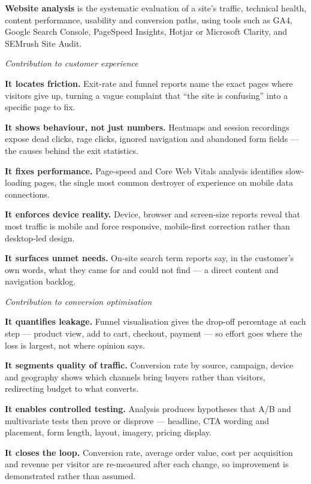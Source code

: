 \begin{qlist}
\textbf{Website analysis} is the systematic evaluation of a site's traffic,
technical health, content performance, usability and conversion paths, using
tools such as GA4, Google Search Console, PageSpeed Insights, Hotjar or
Microsoft Clarity, and SEMrush Site Audit.

\textit{Contribution to customer experience}
\begin{apts}
\item \textbf{It locates friction.} Exit-rate and funnel reports name the exact
      pages where visitors give up, turning a vague complaint that ``the site
      is confusing'' into a specific page to fix.
\item \textbf{It shows behaviour, not just numbers.} Heatmaps and session
      recordings expose dead clicks, rage clicks, ignored navigation and
      abandoned form fields --- the causes behind the exit statistics.
\item \textbf{It fixes performance.} Page-speed and Core Web Vitals analysis
      identifies slow-loading pages, the single most common destroyer of
      experience on mobile data connections.
\item \textbf{It enforces device reality.} Device, browser and screen-size
      reports reveal that most traffic is mobile and force responsive,
      mobile-first correction rather than desktop-led design.
\item \textbf{It surfaces unmet needs.} On-site search term reports say, in the
      customer's own words, what they came for and could not find --- a direct
      content and navigation backlog.
\end{apts}

\textit{Contribution to conversion optimisation}
\begin{apts}\setcounter{enumi}{5}
\item \textbf{It quantifies leakage.} Funnel visualisation gives the drop-off
      percentage at each step --- product view, add to cart, checkout, payment
      --- so effort goes where the loss is largest, not where opinion says.
\item \textbf{It segments quality of traffic.} Conversion rate by source,
      campaign, device and geography shows which channels bring buyers rather
      than visitors, redirecting budget to what converts.
\item \textbf{It enables controlled testing.} Analysis produces hypotheses that
      A/B and multivariate tests then prove or disprove --- headline, CTA
      wording and placement, form length, layout, imagery, pricing display.
\item \textbf{It closes the loop.} Conversion rate, average order value, cost
      per acquisition and revenue per visitor are re-measured after each
      change, so improvement is demonstrated rather than assumed.
\end{apts}


\end{qlist}
